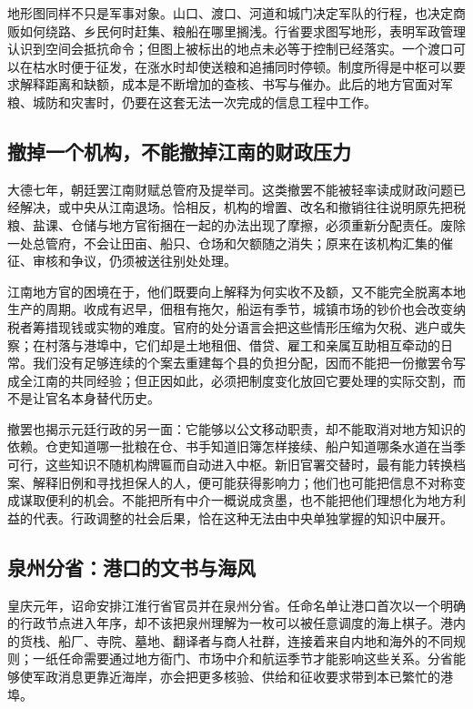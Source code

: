 地形图同样不只是军事对象。山口、渡口、河道和城门决定军队的行程，也决定商贩如何绕路、乡民何时赶集、粮船在哪里搁浅。行省要求图写地形，表明军政管理认识到空间会抵抗命令；但图上被标出的地点未必等于控制已经落实。一个渡口可以在枯水时便于征发，在涨水时却使送粮和追捕同时停顿。制度所得是中枢可以要求解释距离和缺额，成本是不断增加的查核、书写与催办。此后的地方官面对军粮、城防和灾害时，仍要在这套无法一次完成的信息工程中工作。

\subsection{撤掉一个机构，不能撤掉江南的财政压力}

大德七年，朝廷罢江南财赋总管府及提举司。这类撤罢不能被轻率读成财政问题已经解决，或中央从江南退场。恰相反，机构的增置、改名和撤销往往说明原先把税粮、盐课、仓储与地方官衔捆在一起的办法出现了摩擦，必须重新分配责任。废除一处总管府，不会让田亩、船只、仓场和欠额随之消失；原来在该机构汇集的催征、审核和争议，仍须被送往别处处理。

江南地方官的困境在于，他们既要向上解释为何实收不及额，又不能完全脱离本地生产的周期。收成有迟早，佃租有拖欠，船运有季节，城镇市场的钞价也会改变纳税者筹措现钱或实物的难度。官府的处分语言会把这些情形压缩为欠税、逃户或失察；在村落与港埠中，它们却是土地租佃、借贷、雇工和亲属互助相互牵动的日常。我们没有足够连续的个案去重建每个县的负担分配，因而不能把一份撤罢令写成全江南的共同经验；但正因如此，必须把制度变化放回它要处理的实际交割，而不是让官名本身替代历史。

撤罢也揭示元廷行政的另一面：它能够以公文移动职责，却不能取消对地方知识的依赖。仓吏知道哪一批粮在仓、书手知道旧簿怎样接续、船户知道哪条水道在当季可行，这些知识不随机构牌匾而自动进入中枢。新旧官署交替时，最有能力转换档案、解释旧例和寻找担保人的人，便可能获得影响力；他们也可能把信息不对称变成谋取便利的机会。不能把所有中介一概说成贪墨，也不能把他们理想化为地方利益的代表。行政调整的社会后果，恰在这种无法由中央单独掌握的知识中展开。

\subsection{泉州分省：港口的文书与海风}

皇庆元年，诏命安排江淮行省官员并在泉州分省。任命名单让港口首次以一个明确的行政节点进入年序，却不该把泉州理解为一枚可以被任意调度的海上棋子。港内的货栈、船厂、寺院、墓地、翻译者与商人社群，连接着来自内地和海外的不同规则；一纸任命需要通过地方衙门、市场中介和航运季节才能影响这些关系。分省能够使军政消息更靠近海岸，亦会把更多核验、供给和征收要求带到本已繁忙的港埠。

